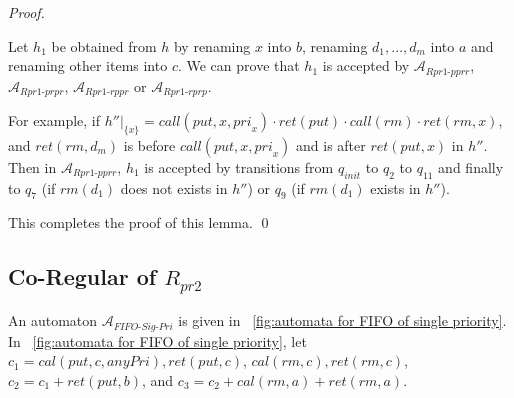 \begin {proof}
\begin{itemize}
    Let $h_1$ be obtained from $h$ by renaming $x$ into $b$, renaming $d_1,\ldots,d_m$ into $a$ and renaming other items into $c$. We can prove that $h_1$ is accepted by $\mathcal{A}_{\textit{Rpr1-pprr}}$, $\mathcal{A}_{\textit{Rpr1-prpr}}$, $\mathcal{A}_{\textit{Rpr1-rppr}}$ or $\mathcal{A}_{\textit{Rpr1-rprp}}$.

    For example, if $h'' \vert_{ \{ x \} } = \textit{call}(\textit{put},x,\textit{pri}_x) \cdot \textit{ret}(\textit{put}) \cdot \textit{call}(\textit{rm}) \cdot \textit{ret}(\textit{rm},x)$, and $\textit{ret}(\textit{rm},d_m)$ is before $\textit{call}(\textit{put},x,\textit{pri}_x)$ and is after $\textit{ret}(\textit{put},x)$ in $h''$. Then in  $\mathcal{A}_{\textit{Rpr1-pprr}}$, $h_1$ is accepted by transitions from $q_{\textit{init}}$ to $q_2$ to $q_{11}$ and finally to $q_7$ (if $\textit{rm}(d_1)$ does not exists in $h''$) or $q_9$ (if $\textit{rm}(d_1)$ exists in $h''$).
\end{itemize}

This completes the proof of this lemma. \qed
\end {proof}




\subsection{Co-Regular of $R_{\textit{pr2}}$}
\label{subsec:co-regular of Rpr2}

An automaton $\mathcal{A}_{\textit{FIFO-Sig-Pri}}$ is given in \figurename~\ref{fig:automata for FIFO of single priority}. In \figurename~\ref{fig:automata for FIFO of single priority}, let $c_1= \textit{cal}(\textit{put},c,\textit{anyPri}),\textit{ret}(\textit{put},c)$, $\textit{cal}(\textit{rm},c),\textit{ret}(\textit{rm},c)$, $c_2 = c_1 + \textit{ret}(\textit{put},b)$, and $c_3 = c_2 + \textit{cal}(\textit{rm},a) + \textit{ret}(\textit{rm},a)$.

